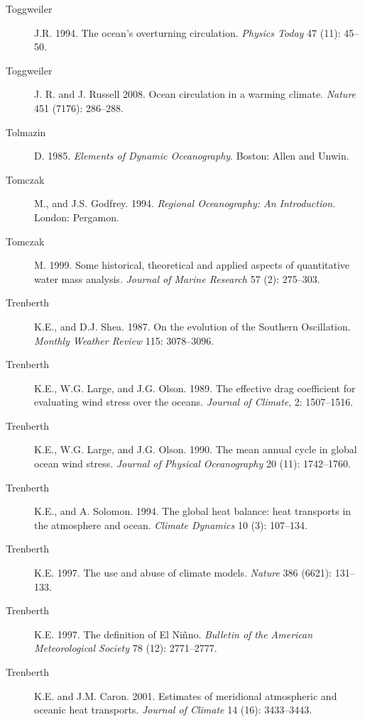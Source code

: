 \begin{description}
\item [Toggweiler]J.R. 1994. The ocean's overturning
  circulation. \textit{Physics Today} 47 (11): 45--50.

\item [Toggweiler]J. R. and J. Russell 2008. Ocean circulation in a
  warming climate. \textit{Nature} 451 (7176): 286--288.

\item [Tolmazin]D. 1985. \textit{Elements of Dynamic
  Oceanography}. Boston: Allen and Unwin.

\item [Tomczak]M., and J.S. Godfrey. 1994. \textit{Regional
  Oceanography: An Introduction}. London: Pergamon.

\item [Tomczak]M. 1999. Some historical, theoretical and applied
  aspects of quantitative water mass analysis. \textit{Journal of
    Marine Research} 57 (2): 275--303.

\item [Trenberth]K.E., and D.J. Shea. 1987. On the evolution of the
  Southern Oscillation. \textit{Monthly Weather Review} 115:
  3078--3096.

\item [Trenberth]K.E., W.G. Large, and J.G. Olson. 1989. The effective
  drag coefficient for evaluating wind stress over the
  oceans. \textit{Journal of Climate}, 2: 1507--1516.

\item [Trenberth]K.E., W.G. Large, and J.G. Olson. 1990. The mean
  annual cycle in global ocean wind stress. \textit{Journal of
    Physical Oceanography} 20 (11): 1742--1760.

\item [Trenberth]K.E., and A. Solomon. 1994. The global heat balance:
  heat transports in the atmosphere and ocean. \textit{Climate
    Dynamics} 10 (3): 107--134.

\item [Trenberth]K.E. 1997. The use and abuse of climate
  models. \textit{Nature} 386 (6621): 131--133.

\item [Trenberth]K.E. 1997. The definition of El
  Ni\~{n}no. \textit{Bulletin of the American Meteorological Society}
  78 (12): 2771--2777.

\item [Trenberth]K.E. and J.M. Caron. 2001. Estimates of meridional
  atmospheric and oceanic heat transports. \textit{Journal of Climate}
  14 (16): 3433--3443.


\end{description}
